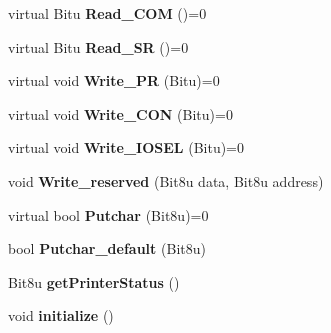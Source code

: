 \begin{DoxyCompactItemize}
\item 
\hypertarget{classCParallel_ae29345363bf6142ff5279f0a5db34fe0}{virtual Bitu {\bfseries Read\-\_\-\-C\-O\-M} ()=0}\label{classCParallel_ae29345363bf6142ff5279f0a5db34fe0}

\item 
\hypertarget{classCParallel_a5ab6eb5ec5cff6ca661fa04cede7c6de}{virtual Bitu {\bfseries Read\-\_\-\-S\-R} ()=0}\label{classCParallel_a5ab6eb5ec5cff6ca661fa04cede7c6de}

\item 
\hypertarget{classCParallel_a4ae135be13ad44222c0cd789aa7effd7}{virtual void {\bfseries Write\-\_\-\-P\-R} (Bitu)=0}\label{classCParallel_a4ae135be13ad44222c0cd789aa7effd7}

\item 
\hypertarget{classCParallel_ac0825059ea487383352a4a2194bfe509}{virtual void {\bfseries Write\-\_\-\-C\-O\-N} (Bitu)=0}\label{classCParallel_ac0825059ea487383352a4a2194bfe509}

\item 
\hypertarget{classCParallel_a9cb37e39c63d01ca3eb7b79dbfa67687}{virtual void {\bfseries Write\-\_\-\-I\-O\-S\-E\-L} (Bitu)=0}\label{classCParallel_a9cb37e39c63d01ca3eb7b79dbfa67687}

\item 
\hypertarget{classCParallel_a83a2180dc69d0c253ee9a5a2ef540a39}{void {\bfseries Write\-\_\-reserved} (Bit8u data, Bit8u address)}\label{classCParallel_a83a2180dc69d0c253ee9a5a2ef540a39}

\item 
\hypertarget{classCParallel_a8a8020faba1f51c4226185334a2a83e4}{virtual bool {\bfseries Putchar} (Bit8u)=0}\label{classCParallel_a8a8020faba1f51c4226185334a2a83e4}

\item 
\hypertarget{classCParallel_ad78fe2e8e54a76043d05e55ddf041457}{bool {\bfseries Putchar\-\_\-default} (Bit8u)}\label{classCParallel_ad78fe2e8e54a76043d05e55ddf041457}

\item 
\hypertarget{classCParallel_ac03346b2c112fe9db67acf2250023532}{Bit8u {\bfseries get\-Printer\-Status} ()}\label{classCParallel_ac03346b2c112fe9db67acf2250023532}

\item 
\hypertarget{classCParallel_a4de0462d0fcc42ac21570685b36c1138}{void {\bfseries initialize} ()}\label{classCParallel_a4de0462d0fcc42ac21570685b36c1138}

\end{DoxyCompactItemize}
